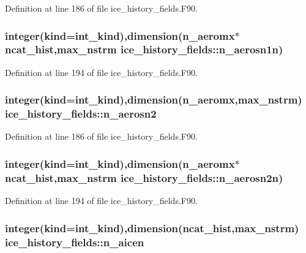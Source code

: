 Definition at line 186 of file ice\_\-history\_\-fields.F90.\hypertarget{namespaceice__history__fields_ac520de6cb3b77c13aca8ca21845734f2}{
\subsubsection[{n\_\-aerosn1n}]{\setlength{\rightskip}{0pt plus 5cm}integer(kind=int\_\-kind),dimension(n\_\-aeromx$\ast${\bf ncat\_\-hist},max\_\-nstrm {\bf ice\_\-history\_\-fields::n\_\-aerosn1n})}}
\label{namespaceice__history__fields_ac520de6cb3b77c13aca8ca21845734f2}


Definition at line 194 of file ice\_\-history\_\-fields.F90.\hypertarget{namespaceice__history__fields_a4c7ca26f7fe5c329bea1bd5e4a301eed}{
\subsubsection[{n\_\-aerosn2}]{\setlength{\rightskip}{0pt plus 5cm}integer(kind=int\_\-kind),dimension(n\_\-aeromx,max\_\-nstrm) {\bf ice\_\-history\_\-fields::n\_\-aerosn2}}}
\label{namespaceice__history__fields_a4c7ca26f7fe5c329bea1bd5e4a301eed}


Definition at line 186 of file ice\_\-history\_\-fields.F90.\hypertarget{namespaceice__history__fields_a418c55bcea4b5e65a38aa22c871db56f}{
\subsubsection[{n\_\-aerosn2n}]{\setlength{\rightskip}{0pt plus 5cm}integer(kind=int\_\-kind),dimension(n\_\-aeromx$\ast${\bf ncat\_\-hist},max\_\-nstrm {\bf ice\_\-history\_\-fields::n\_\-aerosn2n})}}
\label{namespaceice__history__fields_a418c55bcea4b5e65a38aa22c871db56f}


Definition at line 194 of file ice\_\-history\_\-fields.F90.\hypertarget{namespaceice__history__fields_a31b00fc2e404e255f40cfa9144865c6f}{
\subsubsection[{n\_\-aicen}]{\setlength{\rightskip}{0pt plus 5cm}integer(kind=int\_\-kind),dimension({\bf ncat\_\-hist},max\_\-nstrm) {\bf ice\_\-history\_\-fields::n\_\-aicen}}}
\label{namespaceice__history__fields_a31b00fc2e404e255f40cfa9144865c6f}


